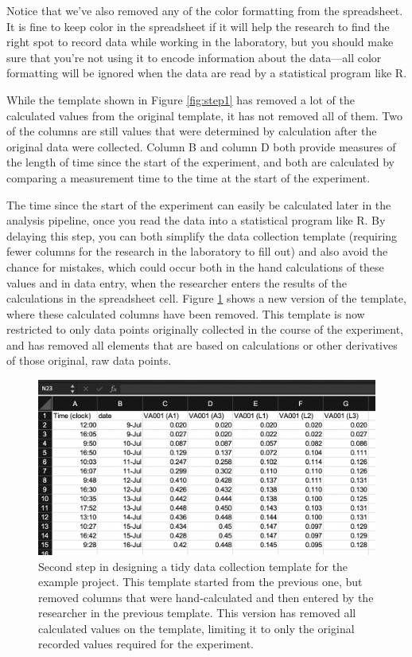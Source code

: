 \documentclass[]{tufte-book}
\begin{document}
Notice that we've also removed any of the color formatting from the spreadsheet. It is fine to
keep color in the spreadsheet if it will help the research to find the right spot to record data
while working in the laboratory, but you should make sure that you're not using it to encode
information about the data---all color formatting will be ignored when the data are read by a
statistical program like R.

While the template shown in Figure \ref{fig:step1} has removed a lot of the calculated values from the
original template, it has not removed all of them. Two of the columns are still values that were
determined by calculation after the original data were collected. Column B and column D both provide
measures of the length of time since the start of the experiment, and both are calculated by
comparing a measurement time to the time at the start of the experiment.

The time since the start of the experiment can easily be calculated later in the analysis pipeline,
once you read the data into a statistical program like R. By delaying this step, you can both
simplify the data collection template (requiring fewer columns for the research in the laboratory
to fill out) and also avoid the chance for mistakes, which could occur both in the hand calculations
of these values and in data entry, when the researcher enters the results of the calculations in the
spreadsheet cell. Figure \ref{fig:step2} shows a new version of the template, where these calculated
columns have been removed. This template is now restricted to only data points originally collected
in the course of the experiment, and has removed all elements that are based on calculations or other
derivatives of those original, raw data points.

\begin{figure}
\includegraphics[width=\textwidth]{figures/growth_curve_step2} \caption[Second step in designing a tidy data collection template for the example project]{Second step in designing a tidy data collection template for the example project. This template started from the previous one, but removed columns that were hand-calculated and then entered by the researcher in the previous template. This version has removed all calculated values on the template, limiting it to only the original recorded values required for the experiment.}\label{fig:step2}
\end{figure}
\end{document}
